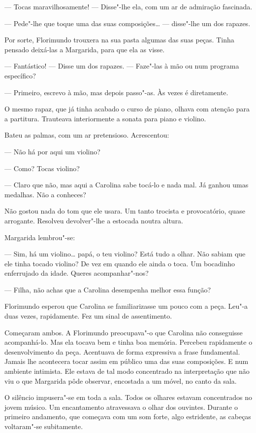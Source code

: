 --- Tocas maravilhosamente! --- Disse"-lhe ela, com um ar de admiração
fascinada.

--- Pede"-lhe que toque uma das suas composições\ldots{} --- disse"-lhe um dos
rapazes.

Por sorte, Florimundo trouxera na sua pasta algumas das suas peças.
Tinha pensado deixá-las a Margarida, para que ela as visse.

--- Fantástico! --- Disse um dos rapazes. --- Faze"-las à mão ou num programa
específico?

--- Primeiro, escrevo à mão, mas depois passo"-as. Às vezes é diretamente.

O mesmo rapaz, que já tinha acabado o curso de piano, olhava com atenção
para a partitura. Trauteava interiormente a sonata para piano e violino.

Bateu as palmas, com um ar pretensioso. Acrescentou:

--- Não há por aqui um violino?

--- Como? Tocas violino?

--- Claro que não, mas aqui a Carolina sabe tocá-lo e nada mal. Já ganhou
umas medalhas. Não a conheces?

Não gostou nada do tom que ele usara. Um tanto trocista e provocatório,
quase arrogante. Resolveu devolver"-lhe a estocada noutra altura.

Margarida lembrou"-se:

--- Sim, há um violino\ldots{} papá, o teu violino? Está tudo a olhar. Não
sabiam que ele tinha tocado violino? De vez em quando ele ainda o toca.
Um bocadinho enferrujado da idade. Queres acompanhar"-nos?

--- Filha, não achas que a Carolina desempenha melhor essa função?

Florimundo esperou que Carolina se familiarizasse um pouco com a peça.
Leu"-a duas vezes, rapidamente. Fez um sinal de assentimento.

Começaram ambos. A Florimundo preocupava"-o que Carolina não conseguisse
acompanhá-lo. Mas ela tocava bem e tinha boa memória. Percebeu
rapidamente o desenvolvimento da peça. Acentuava de forma expressiva a
frase fundamental. Jamais lhe acontecera tocar assim em público uma das
suas composições. E num ambiente intimista. Ele estava de tal modo
concentrado na interpretação que não viu o que Margarida pôde observar,
encostada a um móvel, no canto da sala.

O silêncio impusera"-se em toda a sala. Todos os olhares estavam
concentrados no jovem músico. Um encantamento atravessava o olhar dos
ouvintes. Durante o primeiro andamento, que começava com um som forte,
algo estridente, as cabeças voltaram"-se subitamente.


